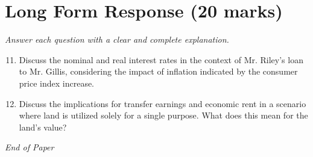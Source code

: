 \documentclass[12pt]{article}
\begin{document}
\section*{Long Form Response (20 marks)}
\textit{Answer each question with a clear and complete explanation.}
\begin{enumerate}[label=\arabic*.]
\setcounter{enumi}{10}
\item Discuss the nominal and real interest rates in the context of Mr. Riley's loan to Mr. Gillis, considering the impact of inflation indicated by the consumer price index increase.
\item Discuss the implications for transfer earnings and economic rent in a scenario where land is utilized solely for a single purpose. What does this mean for the land's value?
\end{enumerate}

\vfill
\noindent\textit{End of Paper}
\end{document}

